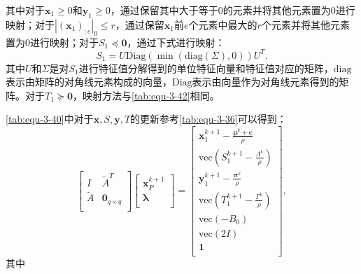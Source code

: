 其中对于$\mathbf{x}_1\geqslant 0$和$\mathbf{y}_1\geqslant 0$，通过保留其中大于等于0的元素并将其他元素置为0进行映射；对于$|\left( \mathbf{x}_1 \right) _{:e}|_0\le r$，通过保留$\mathbf{x}_1$前$e$个元素中最大的$r$个元素并将其他元素置为0进行映射；对于$S_1\preceq \mathbf{0}$，通过下式进行映射：
\begin{equation}
    \label{tab:equ-3-42}
    S_1=U\mathrm{Diag}\left( \min \left( \mathrm{diag}\left( \varSigma \right) ,0 \right) \right) U^T.
\end{equation}
其中$U$和$\varSigma$是对$S_1$进行特征值分解得到的单位特征向量和特征值对应的矩阵，$\mathrm{diag}$表示由矩阵的对角线元素构成的向量，$\mathrm{Diag}$表示由向量作为对角线元素得到的矩阵。对于$T_1\succcurlyeq \mathbf{0}$，映射方法与\autoref{tab:equ-3-42}相同。

\autoref{tab:equ-3-40}中对于$\mathbf{x},S,\mathbf{y},T$的更新参考\autoref{tab:equ-3-36}可以得到：
\begin{equation}
    \label{tab:equ-3-43}
    \left[ \begin{matrix}
        I&		\tilde{A}^T\\
        \tilde{A}&		\mathbf{0}_{q\times q}\\
    \end{matrix} \right] \left[ \begin{array}{c}
        \mathbf{x}_{P}^{k+1}\\
        \boldsymbol{\lambda }\\
    \end{array} \right] =\left[ \begin{array}{c}
        \mathbf{x}_{1}^{k+1}-\frac{\boldsymbol{\mu }^k+\boldsymbol{c}}{\rho}\\
        \mathrm{vec}\left( S_{1}^{k+1}-\frac{\Lambda ^k}{\rho} \right)\\
        \mathbf{y}_{1}^{k+1}-\frac{\boldsymbol{\sigma }^k}{\rho}\\
        \mathrm{vec}\left( T_{1}^{k+1}-\frac{\varGamma ^k}{\rho} \right)\\
        \mathrm{vec}\left( -B_0 \right)\\
        \mathrm{vec}\left( 2I \right)\\
        \mathbf{1}\\
    \end{array} \right], 
\end{equation}
其中
